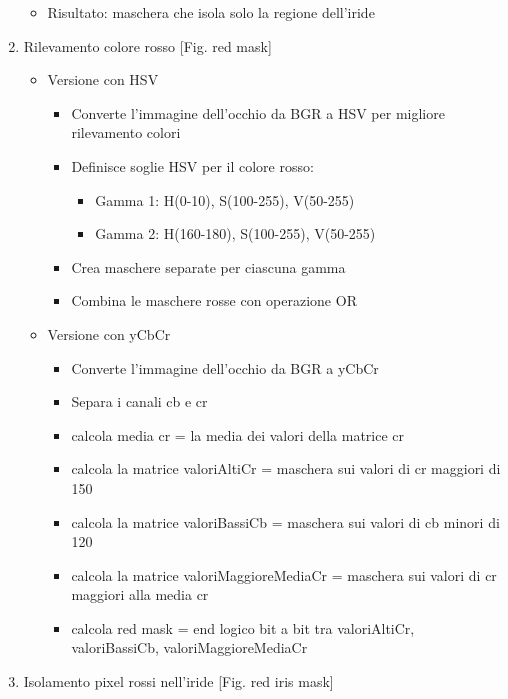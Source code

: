 \documentclass[12pt,a4paper,openright,twoside]{book}
\begin{document}
\begin{enumerate}
\begin{itemize}
        \item Risultato: maschera che isola solo la regione dell'iride
    \end{itemize}
    \item Rilevamento colore rosso [Fig. red mask] 
    \begin{itemize}
        \item Versione con HSV
            \begin{itemize}
                \item Converte l'immagine dell'occhio da BGR a HSV per migliore rilevamento colori
                \item Definisce soglie HSV per il colore rosso: \begin{itemize}
                    \item Gamma 1: H(0-10), S(100-255), V(50-255)
                    \item Gamma 2: H(160-180), S(100-255), V(50-255)
                \end{itemize}
                \item Crea maschere separate per ciascuna gamma
                \item Combina le maschere rosse con operazione OR
            \end{itemize}
        \item Versione con yCbCr
            \begin{itemize}
                \item Converte l'immagine dell'occhio da BGR a yCbCr
                \item Separa i canali cb e cr
                \item calcola media cr = la media dei valori della matrice cr
                \item calcola la matrice valoriAltiCr = maschera sui valori di cr maggiori di 150
                \item calcola la matrice valoriBassiCb = maschera sui valori di cb minori di 120
                \item calcola la matrice valoriMaggioreMediaCr = maschera sui valori di cr maggiori alla media cr
                \item calcola red mask = end logico bit a bit tra valoriAltiCr, valoriBassiCb, valoriMaggioreMediaCr
            \end{itemize}
    \end{itemize}
    \item Isolamento pixel rossi nell'iride [Fig. red iris mask] \begin{itemize}

\end{itemize}
\end{enumerate}
\end{document}
